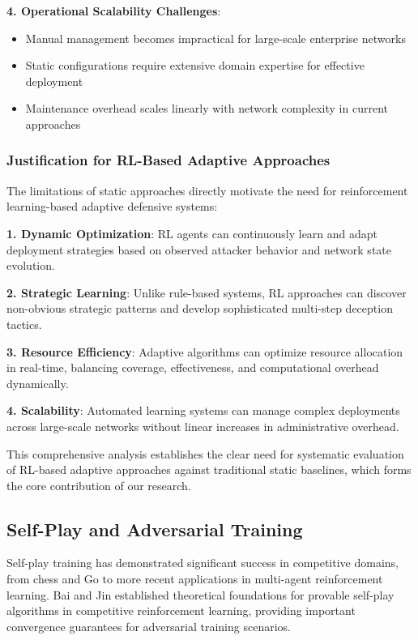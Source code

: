 \documentclass[12pt]{article}
\theoremstyle{definition}
\theoremstyle{plain}
\begin{document}
\textbf{4. Operational Scalability Challenges}:
\begin{itemize}
\item Manual management becomes impractical for large-scale enterprise networks
\item Static configurations require extensive domain expertise for effective deployment
\item Maintenance overhead scales linearly with network complexity in current approaches
\end{itemize}

\subsubsection{Justification for RL-Based Adaptive Approaches}

The limitations of static approaches directly motivate the need for reinforcement learning-based adaptive defensive systems:

\textbf{1. Dynamic Optimization}: RL agents can continuously learn and adapt deployment strategies based on observed attacker behavior and network state evolution.

\textbf{2. Strategic Learning}: Unlike rule-based systems, RL approaches can discover non-obvious strategic patterns and develop sophisticated multi-step deception tactics.

\textbf{3. Resource Efficiency}: Adaptive algorithms can optimize resource allocation in real-time, balancing coverage, effectiveness, and computational overhead dynamically.

\textbf{4. Scalability}: Automated learning systems can manage complex deployments across large-scale networks without linear increases in administrative overhead.

This comprehensive analysis establishes the clear need for systematic evaluation of RL-based adaptive approaches against traditional static baselines, which forms the core contribution of our research.

\subsection{Self-Play and Adversarial Training}

Self-play training has demonstrated significant success in competitive domains, from chess and Go to more recent applications in multi-agent reinforcement learning. Bai and Jin \cite{bai2020provable} established theoretical foundations for provable self-play algorithms in competitive reinforcement learning, providing important convergence guarantees for adversarial training scenarios.
\end{document}
